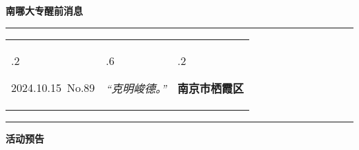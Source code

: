 \documentclass[letterpaper, 12pt]{article}
\begin{document}
\begin{center}
    \Huge\textbf{南哪大专醒前消息}
\end{center}
\vspace{4mm}
\hrule
\renewcommand\tabularxcolumn[1]{m{#1}}
\begin{tabularx}{\textwidth}{>{\hsize.2\hsize}X>{\hsize.6\hsize}X>{\hsize.2\hsize}X}
    \begin{flushleft}
        2024.10.15\, No.89
    \end{flushleft}
    &
    \begin{center}
        \textit{“克明峻德。”}
    \end{center}
    &
    \begin{flushright}
        \textbf{南京市栖霞区}
    \end{flushright}
\end{tabularx}
\vspace{-3.5mm}
\hrule
\vspace{4mm}
\centerline{\huge\textbf{活动预告}}
\end{document}
